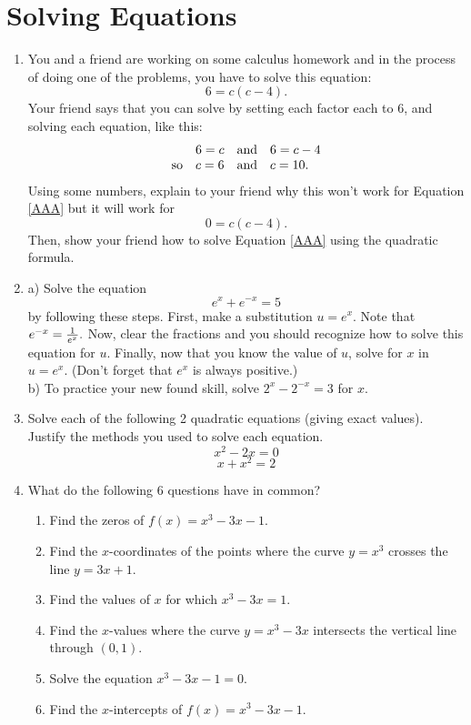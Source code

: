\section{Solving Equations}
\begin{enumerate}

\item You and a friend are working on some calculus homework and in the process of doing one of the problems, you have to solve this equation:
		 \begin{equation}
6 = c\left( {c - 4} \right)
.\label{AAA}\end{equation}
Your friend says that you can solve by setting each factor each to 6, and solving each equation, like this:$$
\begin{array}{clcl}
   &6 = c& {\rm{ and }}& 6 = c - 4  \\
   {\rm{so }}&c = 6& {\rm{ and }}& c = 10. \\ 
\end{array}$$	 
Using some numbers, explain to your friend why this won't work for Equation \ref{AAA} but it will work for 
		 $$
0 = c\left( {c - 4} \right).
$$
Then, show your friend how to solve Equation \ref{AAA} using the quadratic formula.

\item a)  Solve the equation $$e^x  + e^{ - x}  = 5$$ by following these steps.  First, make a substitution $u = e^x .$  Note that $e^{ - x}  = {1 \over {e^x }}.$  Now, clear the fractions and you should recognize how to solve this equation for $u$.  Finally, now that you know the value of $u$, solve for $x$ in $u = e^x .$  (Don't forget that $e^x$ is always positive.) \\  b)  To practice your new found skill, solve $2^x  - 2^{ - x}  = 3$ for $x$.

\item Solve each of the following 2 quadratic equations (giving exact values).  Justify the methods you used to solve each equation.  $$x^2 - 2x = 0$$ $$x + x^2 = 2$$

\item What do the following 6 questions have in common?
\begin{enumerate}\item  Find the zeros of $f(x) = x^3 - 3x - 1$.
\item  Find the $x$-coordinates of the points where the curve $y = x^3$  crosses the line $y = 3x + 1$.
\item Find the values of $x$ for which $x^3 - 3x = 1$.
\item  Find the $x$-values where the curve $y = x^3 - 3x$ intersects the vertical line through $(0, 1)$.
\item Solve the equation $x^3 - 3x - 1 = 0$.
\item  Find the $x$-intercepts of $f(x) = x^3 - 3x - 1$.
\end{enumerate}

\end{enumerate}

